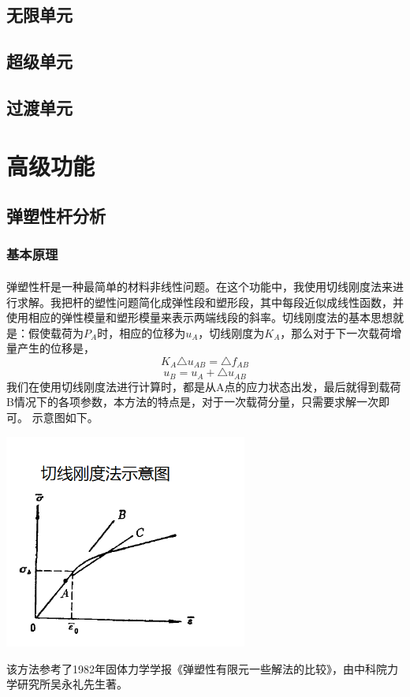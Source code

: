 \documentclass[UTF8]{ctexbook}
\begin{document}
\subsection{无限单元}

\subsection{超级单元}

\subsection{过渡单元}

\section{高级功能}
\subsection{弹塑性杆分析}





\subsubsection{基本原理}
\paragraph{}
弹塑性杆是一种最简单的材料非线性问题。在这个功能中，我使用切线刚度法来进行求解。我把杆的塑性问题简化成弹性段和塑形段，其中每段近似成线性函数，并使用相应的弹性模量和塑形模量来表示两端线段的斜率。切线刚度法的基本思想就是：假使载荷为$P_A$时，相应的位移为$u_A$，切线刚度为$K_A$，那么对于下一次载荷增量产生的位移是，
$$K_A\triangle u_{AB}=\triangle f_{AB}$$
$$u_B=u_A+\triangle u_{AB}$$
我们在使用切线刚度法进行计算时，都是从A点的应力状态出发，最后就得到载荷B情况下的各项参数，本方法的特点是，对于一次载荷分量，只需要求解一次即可。
示意图如下。
\begin{center}
\includegraphics[width=0.6\textwidth]{plastic7.png}
\end{center}
该方法参考了1982年固体力学学报《弹塑性有限元一些解法的比较》，由中科院力学研究所吴永礼先生著。
\end{document}
